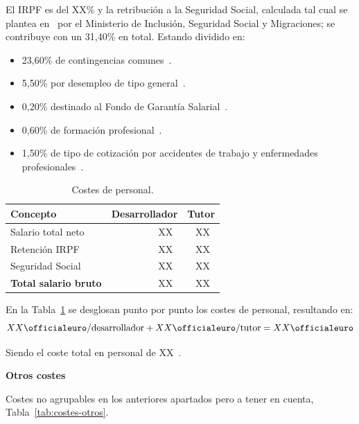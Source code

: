 El IRPF es del XX\% y la retribución a la Seguridad Social, calculada tal cual se plantea en~\cite{ss_cotizacion} por el Ministerio de Inclusión, Seguridad Social y Migraciones; se contribuye con un 31,40\% en total. Estando dividido en:
\begin{itemize}
\tightlist
\item 23,60\% de contingencias comunes~\cite{BOEPCM2442022}.
\item 5,50\% por desempleo de tipo general~\cite{BOEPCM2442022}.
\item 0,20\% destinado al Fondo de Garantía Salarial~\cite{BOEPCM2442022}.
\item 0,60\% de formación profesional~\cite{BOEPCM2442022}.
\item 1,50\% de tipo de cotización por accidentes de trabajo y enfermedades profesionales~\cite{BOEENFERMEDADES}.
\end{itemize}

\begin{table}[H]
\centering
\begin{tabular}{lrr}
	\toprule
	\textbf{Concepto} & \textbf{Desarrollador} & \textbf{Tutor}\\
	\midrule
	Salario total neto & XX~\officialeuro & XX~\officialeuro \\
	Retención IRPF & XX~\officialeuro & XX~\officialeuro \\
	Seguridad Social & XX~\officialeuro & XX~\officialeuro \\
	\midrule
	\textbf{Total salario bruto} & XX~\officialeuro & XX~\officialeuro \\
	\bottomrule
\end{tabular}
\caption{Costes de personal.}\label{tab:costes-personal}
\end{table}

En la Tabla~\ref{tab:costes-personal} se desglosan punto por punto los costes de personal, resultando en:
\[ XX\text{\officialeuro/desarrollador} + XX\text{\officialeuro/tutor} = XX\text{\officialeuro}\]

Siendo el coste total en personal de XX~\officialeuro.

\textbf{Otros costes}

Costes no agrupables en los anteriores apartados pero a tener en cuenta, Tabla~\ref{tab:costes-otros}.

